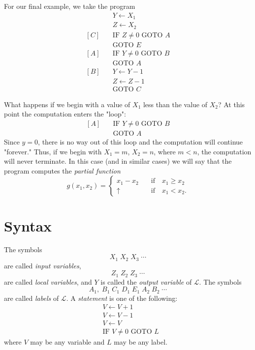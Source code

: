 \documentclass[12pt,a4paper,twoside,openany]{book}
\begin{document}
For our final example, we take the program
\begin{equation*}
    \begin{aligned}&Y\leftarrow X_{1}\\ &Z\leftarrow X_{2}\\ [C]\quad&\text{IF }Z\neq0\text{ GOTO }A\\ &\text{GOTO }E\\ [A]\quad&\text{IF }Y\neq0\text{ GOTO }B\\ &\text{GOTO }A\\ [B]\quad&Y\leftarrow Y-1\\ &Z\leftarrow Z-1\\ &\text{GOTO }C\end{aligned}
\end{equation*}

What happens if we begin with a value of $X_1$ less than the value of $X_2$? At this point the computation enters the "loop":
\begin{equation*}
    \begin{aligned}[A]\quad&\text{IF }Y\neq 0\text{ GOTO }B\\&\text{GOTO }A\end{aligned}
\end{equation*}
Since $y=0$, there is no way out of this loop and the computation will continue "forever." Thus, if we begin with $X_1=m$, $X_2=n$, where $m<n$, the computation will never terminate. In this case (and in similar cases) we will say that the program computes the \textit{partial function} $$g(x_1,x_2)=\begin{cases}x_1-x_2&\quad\text{if}\quad x_1\geq x_2\\\uparrow&\quad\text{if}\quad x_1<x_2.\end{cases}$$

\section{Syntax}

The symbols $$X_1\;X_2\;X_3\;\cdots$$ are called \textit{input variables}, $$Z_1\;Z_2\;Z_3\;\cdots$$ are called \textit{local variables}, and $Y$ is called the \textit{output variable} of $\mathscr{L}$. The symbols $$A_1,\;B_1\;C_1\;D_1\;E_1\;A_2\;B_2\;\cdots$$ are called \textit{labels} of $\mathscr{L}$. A \textit{statement} is one of the following:
\begin{equation*}
    \begin{aligned}&V\leftarrow V+1\\&V\leftarrow V-1\\&V\leftarrow V\\&\text{IF }V\neq 0\text{ GOTO }L\end{aligned}
\end{equation*}
where $V$ may be any variable and $L$ may be any label.
\end{document}
